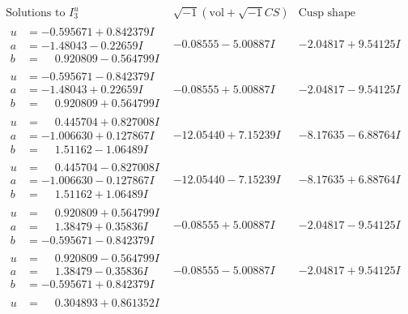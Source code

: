 \documentclass[1p]{elsarticle_modified}
\theoremstyle{definition}
\newcommand{\I}{\sqrt{-1}}
\begin{document}
$$\begin{array}{c|c|c}  
\text{Solutions to }I^u_{3}& \I (\text{vol} + \sqrt{-1}CS) & \text{Cusp shape}\\
 \hline 
\begin{aligned}
u &= -0.595671 + 0.842379 I \\
a &= -1.48043 - 0.22659 I \\
b &= \phantom{-}0.920809 - 0.564799 I\end{aligned}
 & -0.08555 - 5.00887 I & -2.04817 + 9.54125 I \\ \hline\begin{aligned}
u &= -0.595671 - 0.842379 I \\
a &= -1.48043 + 0.22659 I \\
b &= \phantom{-}0.920809 + 0.564799 I\end{aligned}
 & -0.08555 + 5.00887 I & -2.04817 - 9.54125 I \\ \hline\begin{aligned}
u &= \phantom{-}0.445704 + 0.827008 I \\
a &= -1.006630 + 0.127867 I \\
b &= \phantom{-}1.51162 - 1.06489 I\end{aligned}
 & -12.05440 + 7.15239 I & -8.17635 - 6.88764 I \\ \hline\begin{aligned}
u &= \phantom{-}0.445704 - 0.827008 I \\
a &= -1.006630 - 0.127867 I \\
b &= \phantom{-}1.51162 + 1.06489 I\end{aligned}
 & -12.05440 - 7.15239 I & -8.17635 + 6.88764 I \\ \hline\begin{aligned}
u &= \phantom{-}0.920809 + 0.564799 I \\
a &= \phantom{-}1.38479 + 0.35836 I \\
b &= -0.595671 - 0.842379 I\end{aligned}
 & -0.08555 + 5.00887 I & -2.04817 - 9.54125 I \\ \hline\begin{aligned}
u &= \phantom{-}0.920809 - 0.564799 I \\
a &= \phantom{-}1.38479 - 0.35836 I \\
b &= -0.595671 + 0.842379 I\end{aligned}
 & -0.08555 - 5.00887 I & -2.04817 + 9.54125 I \\ \hline\begin{aligned}
u &= \phantom{-}0.304893 + 0.861352 I \\

\end{aligned}
\end{array}$$
\end{document}
